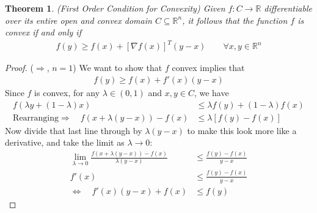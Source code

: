 \documentclass[12pt]{article}
\numberwithin{equation}{section} %
\theoremstyle{plain}
\newtheorem{thm}{Theorem}[section]
\theoremstyle{definition}
\theoremstyle{remark}
\newcommand{\R}{\mathbb{R}}
\newcommand{\Rn}{\mathbb{R}^n}
\begin{document}
\begin{thm}{\emph{(First Order Condition for Convexity)}}
\label{thm:diffconvex}
Given $f:C\rightarrow \R$ differentiable over its entire open and convex
domain $C\subseteq\Rn$, it follows that the function $f$ is convex if
and only if
\begin{align*}
  f(y) \geq f(x) + [\nabla f(x)]^T (y-x)
  \qquad\forall x,y\in\Rn
\end{align*}
\end{thm}
\begin{proof}
($\Rightarrow$, $n=1$) We want to show that $f$ convex implies that
\begin{align*}
  f(y) \geq f(x) + f'(x)(y-x)
\end{align*}
Since $f$ is convex, for any $\lambda\in(0,1)$ and $x,y\in C$, we have
\begin{align*}
  f(\lambda y + (1-\lambda)x)
  &\leq
  \lambda f(y) + (1-\lambda)f(x) \\
  \text{Rearranging} \Rightarrow \quad
  f(x + \lambda (y -x))
  - f(x)
  &\leq
  \lambda \left[f(y) - f(x) \right]
\end{align*}
Now divide that last line through by $\lambda(y-x)$ to make this look
more like a derivative, and take the limit as $\lambda\rightarrow 0$:
\begin{align*}
  \lim_{\lambda\rightarrow 0}
  \frac{f(x + \lambda (y -x)) - f(x)}{\lambda(y-x)}
  &\leq
  \frac{f(y) - f(x)}{y-x} \\
  f'(x)
  &\leq
  \frac{f(y) - f(x)}{y-x}\\
  \Leftrightarrow\quad
  f'(x)(y-x) + f(x)
  &\leq
  f(y)
\end{align*}


\end{proof}
\end{document}
